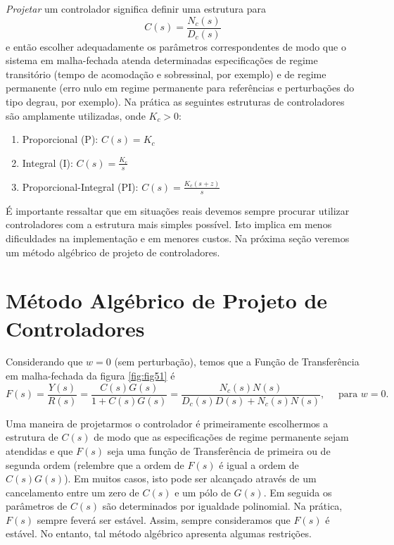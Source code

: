 \documentclass[
]{book}
\providecommand{\tightlist}{%
  \setlength{\itemsep}{0pt}\setlength{\parskip}{0pt}}
\theoremstyle{definition}
\theoremstyle{definition}
\theoremstyle{definition}
\theoremstyle{remark}
\begin{document}
\emph{Projetar} um controlador significa definir uma estrutura para
\[
C(s) = \frac {N_c(s)}{D_c(s)}
\]
e então escolher adequadamente os parâmetros correspondentes de modo que o sistema em malha-fechada atenda determinadas especificações de regime transitório (tempo de acomodação e sobressinal, por exemplo) e de regime permanente (erro nulo em regime permanente para referências e perturbações do tipo degrau, por exemplo). Na prática as seguintes estruturas de controladores são amplamente utilizadas, onde \(K_c>0\):

\begin{enumerate}
\def\labelenumi{\arabic{enumi}.}
\tightlist
\item
  Proporcional (P): \(\boxed{C(s) = K_c}\)
\item
  Integral (I): \(\boxed{C(s) = \frac {K_c}{s}}\)
\item
  Proporcional-Integral (PI): \(\boxed{C(s) = \frac{K_c(s+z)}{s}}\)
\end{enumerate}

É importante ressaltar que em situações reais devemos sempre procurar utilizar controladores com a estrutura mais simples possível. Isto implica em menos dificuldades na implementação e em menores custos. Na próxima seção veremos um método algébrico de projeto de controladores.

\hypertarget{muxe9todo-alguxe9brico-de-projeto-de-controladores}{%
\section{Método Algébrico de Projeto de Controladores}\label{muxe9todo-alguxe9brico-de-projeto-de-controladores}}

Considerando que \(w=0\) (sem perturbação), temos que a Função de Transferência em malha-fechada da figura \ref{fig:fig51} é
\[
F(s) = \frac {Y(s)}{R(s)} = \frac {C(s)G(s)}{1+C(s)G(s)}= \frac {N_c(s)N(s)}{D_c(s)D(s)+N_c(s)N(s)}, \quad \text{ para } w=0.
\]

Uma maneira de projetarmos o controlador é primeiramente escolhermos a estrutura de \(C(s)\) de modo que as especificações de regime permanente sejam atendidas e que \(F(s)\) seja uma função de Transferência de primeira ou de segunda ordem (relembre que a ordem de \(F(s)\) é igual a ordem de \(C(s)G(s)\)). Em muitos casos, isto pode ser alcançado através de um cancelamento entre um zero de \(C(s)\) e um pólo de \(G(s)\). Em seguida os parâmetros de \(C(s)\) são determinados por igualdade polinomial. Na prática, \(F(s)\) sempre feverá ser estável. Assim, sempre consideramos que \(F(s)\) é estável. No entanto, tal método algébrico apresenta algumas restrições.
\end{document}
